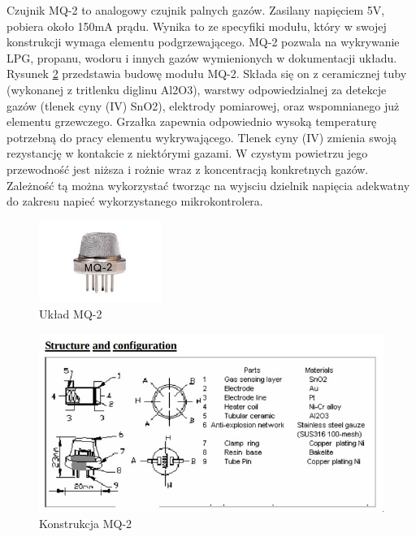 Czujnik MQ-2 to analogowy czujnik palnych gazów. Zasilany napięciem 5V, pobiera około 150mA prądu. Wynika to ze specyfiki modułu, który w swojej konstrukcji wymaga elementu podgrzewającego. MQ-2 pozwala na wykrywanie LPG, propanu, wodoru i innych gazów wymienionych w dokumentacji układu\cite{mq2_datasheet}.
\newline
Rysunek \ref{img:mq_elements} przedstawia budowę modułu MQ-2. Składa się on z ceramicznej tuby (wykonanej z tritlenku diglinu Al2O3), warstwy odpowiedzialnej za detekcje gazów (tlenek cyny (IV) SnO2), elektrody pomiarowej, oraz wspomnianego już elementu grzewczego. Grzałka zapewnia odpowiednio wysoką temperaturę potrzebną do pracy elementu wykrywającego. Tlenek cyny (IV) zmienia swoją rezystancję w kontakcie z niektórymi gazami. W czystym powietrzu jego przewodność jest niższa i rożnie wraz z koncentracją konkretnych gazów. Zależność tą można wykorzystać tworząc na wyjsciu dzielnik napięcia adekwatny do zakresu napieć wykorzystanego mikrokontrolera.
\begin{figure}[H]
    \centering
    \includegraphics[width=4cm]{Graphics/mq2_img.png}
    \caption{Układ MQ-2\cite{bmp_mouser}}
    \label{img:mq_img}
\end{figure}

\begin{figure}[H]
    \centering
    \includegraphics[width=\textwidth, height=\textheight, keepaspectratio]{Graphics/mq_elements.jpg}
    \caption{Konstrukcja MQ-2\cite{mq2_datasheet}}
    \label{img:mq_elements}
\end{figure}

